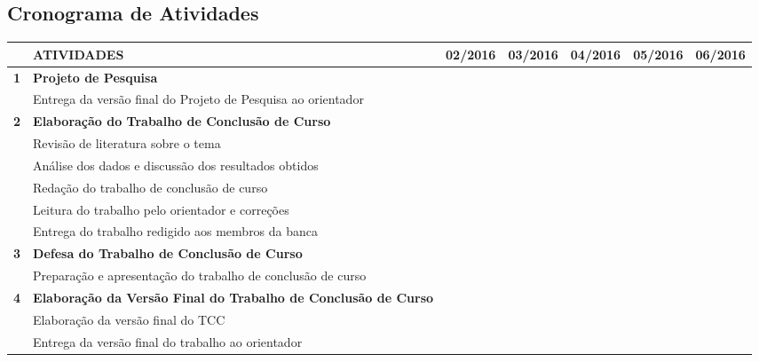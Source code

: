 \documentclass[
	12pt,				%
	openright,			%
	oneside,			%
	a4paper,			%
	brazil				%
	]{abntex2}
\begin{document}
\begin{landscape}    %
\chapter{Cronograma de Atividades}

\begin{table}[h]
\begin{tabular}{lllllll}
\hline
 & \textbf{ATIVIDADES} & \textbf{02/2016} & \textbf{03/2016} & \textbf{04/2016} & \textbf{05/2016} & \textbf{06/2016} \\ \hline
\textbf{1} & \textbf{Projeto de Pesquisa} &  &  &  &  &  \\
 & Entrega da versão final do Projeto de Pesquisa ao orientador & \cellcolor[HTML]{C0C0C0}{\color[HTML]{C0C0C0} } &  &  &  &  \\
\textbf{2} & \textbf{Elaboração do Trabalho de Conclusão de Curso} &  &  &  &  &  \\
 & Revisão de literatura sobre o tema & \cellcolor[HTML]{C0C0C0} & \cellcolor[HTML]{C0C0C0} &  &  &  \\
 & Análise dos dados e discussão dos resultados obtidos &  & \cellcolor[HTML]{C0C0C0} & \cellcolor[HTML]{C0C0C0} & \cellcolor[HTML]{C0C0C0} &  \\
 & Redação do trabalho de conclusão de curso &  &  & \cellcolor[HTML]{C0C0C0} & \cellcolor[HTML]{C0C0C0} &  \\
 & Leitura do trabalho pelo orientador e correções &  &  &  & \cellcolor[HTML]{C0C0C0} & \cellcolor[HTML]{C0C0C0} \\
 & Entrega do trabalho redigido aos membros da banca &  &  &  &  & \cellcolor[HTML]{C0C0C0} \\
\textbf{3} & \textbf{Defesa do Trabalho de Conclusão de Curso} &  &  &  &  &  \\
 & Preparação e apresentação do trabalho de conclusão de curso &  &  &  &  & \cellcolor[HTML]{C0C0C0} \\
\textbf{4} & \textbf{Elaboração da Versão Final do Trabalho de Conclusão de Curso} &  &  &  &  &  \\
 & Elaboração da versão final do TCC &  &  &  &  & \cellcolor[HTML]{C0C0C0} \\
 & Entrega da versão final do trabalho ao orientador &  &  &  &  & \cellcolor[HTML]{C0C0C0} \\ \hline
\end{tabular}
\end{table}
\end{landscape}
\postextual


\setlength{\afterchapskip}{\baselineskip}

\end{document}
